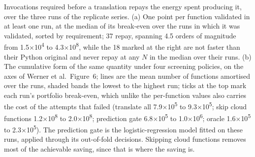 \caption{Invocations required before a translation repays the energy spent producing
  it, over the three runs of the replicate series. (a) One point per function validated in at least one run, at the median of its break-even over the runs in which it was validated, sorted by requirement; 37 repay, spanning 4.5 orders of magnitude
  from 1.5$\times$10\textsuperscript{4} to 4.3$\times$10\textsuperscript{8}, while the 18 marked at the right are not faster than
  their Python original and never repay at any $N$ in the median over their runs. (b) The cumulative form of
  the same quantity under four screening policies, on the axes of Werner et al.\
  Figure~6; lines are the mean number of functions amortised over the runs, shaded bands the lowest to the highest run; ticks at the top mark each run's portfolio break-even, which unlike
  the per-function values also carries the cost of the attempts that failed
  (translate all 7.9$\times$10\textsuperscript{5} to 9.3$\times$10\textsuperscript{5}; skip cloud functions 1.2$\times$10\textsuperscript{8} to 2.0$\times$10\textsuperscript{8}; prediction gate 6.8$\times$10\textsuperscript{5} to 1.0$\times$10\textsuperscript{6}; oracle 1.6$\times$10\textsuperscript{5} to 2.3$\times$10\textsuperscript{5}). The prediction gate is the logistic-regression model fitted on
  these runs, applied through its out-of-fold decisions. Skipping cloud functions removes most of the achievable saving, since that is where the saving is.}
